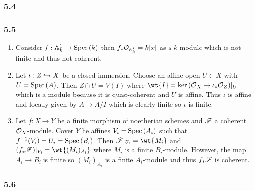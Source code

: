 \documentclass[12pt]{article}
\begin{document}
\subsubsection{5.4}

\subsubsection{5.5}

\begin{enumerate}
\item Consider $f : \mathbb{A}^1_k \to \mathrm{Spec}\left( k \right)$ then $f_* \mathcal{O}_{\mathbb{A}^1_k} = k[x]$ as a $k$-module which is not finite and thus not coherent.
\item Let $\iota : Z \hookrightarrow X$ be a closed immersion. Choose an affine open $U \subset X$ with $U = \mathrm{Spec}\left( A \right)$. Then $Z \cap U = V(I)$ where $\wt{I} = \ker{(\struct{X} \to \iota_* \struct{Z})}|_U$ which is a module because it is quasi-coherent and $U$ is affine. Thus $\iota$ is affine and locally given by $A \to A/I$ which is clearly finite so $\iota$ is finite.
\item Let $f : X \to Y$ be a finite morphism of noetherian schemes and $\mathscr{F}$ a coherent $\mathcal{O}_{X}$-module. Cover $Y$ be affines $V_i = \mathrm{Spec}\left( A_i \right)$ such that $f^{-1}(V_i) = U_i = \mathrm{Spec}\left( B_i \right)$. Then $\F|_{U_i} = \wt{M_i}$ and $(f_* \F)|_{V_i} = \wt{(M_i)_{A_i}}$ where $M_i$ is a finite $B_i$-module. However, the map $A_i \to B_i$ is finite so $(M_i)_{A_i}$ is a finite $A_i$-module and thus $f_* \mathscr{F}$ is coherent.
\end{enumerate}

\subsubsection{5.6}
\end{document}
